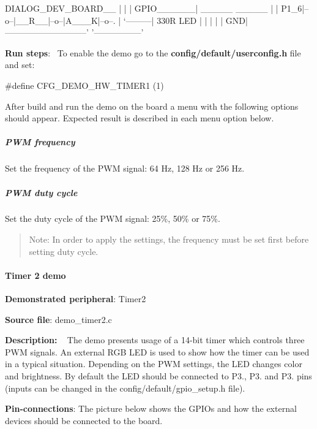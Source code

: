 \begin{DoxyPre}
   DIALOG\_DEV\_BOARD\_\_
   |                 |
   |       GPIO\_\_\_\_\_\_|      \_\_\_\_\_       \_\_\_\_\_
   |       |     P1\_6|--o--|\_\_R\_\_|--o--|A\_\_\_K|--o--.
   |       `---------|      330R         LED       |
   |                 |                             |
   |              GND|-----------------------------'
   '-----------------'
\end{DoxyPre}



\begin{DoxyItemize}
\item {\bfseries Run steps}\+:~\newline
 To enable the demo go to the {\bfseries {\ttfamily config/default/userconfig.\+h}} file and set\+: 
\begin{DoxyCode}
\textcolor{preprocessor}{#define CFG\_DEMO\_HW\_TIMER1      (1)}
\end{DoxyCode}
 After build and run the demo on the board a menu with the following options should appear. Expected result is described in each menu option below.
\end{DoxyItemize}

\subparagraph*{P\+W\+M frequency}

Set the frequency of the P\+W\+M signal\+: 64 Hz, 128 Hz or 256 Hz.

\subparagraph*{P\+W\+M duty cycle}

Set the duty cycle of the P\+W\+M signal\+: 25\%, 50\% or 75\%.

\begin{quote}
Note\+: In order to apply the settings, the frequency must be set first before setting duty cycle. \end{quote}


\paragraph*{Timer 2 demo}


\begin{DoxyItemize}
\item {\bfseries Demonstrated peripheral}\+: Timer2
\item {\bfseries Source file}\+: demo\+\_\+timer2.\+c
\item {\bfseries Description\+:} ~\newline
 The demo presents usage of a 14-\/bit timer which controls three P\+W\+M signals. An external R\+G\+B L\+E\+D is used to show how the timer can be used in a typical situation. Depending on the P\+W\+M settings, the L\+E\+D changes color and brightness. By default the L\+E\+D should be connected to P3., P3. and P3. pins (inputs can be changed in the {\ttfamily config/default/gpio\+\_\+setup.\+h} file).
\item {\bfseries Pin-\/connections}\+: The picture below shows the G\+P\+I\+Os and how the external devices should be connected to the board.
\end{DoxyItemize}


